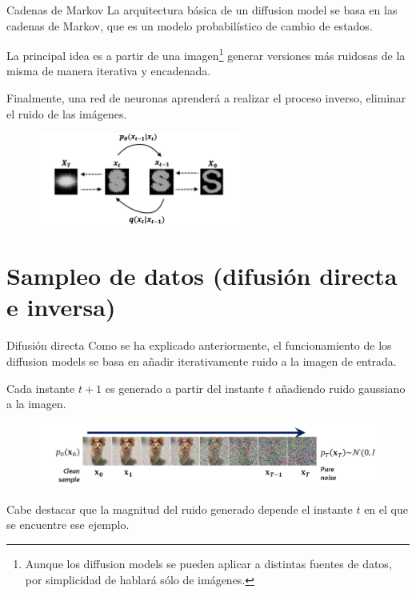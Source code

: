 \begin{frame}{Cadenas de Markov}
La arquitectura básica de un diffusion model se basa en las \alert{cadenas de Markov}, que es un modelo probabilístico de cambio de estados.

La principal idea es a partir de una imagen\footnote{Aunque los diffusion models se pueden aplicar a distintas fuentes de datos, por simplicidad de hablará sólo de imágenes.} generar \alert{versiones más ruidosas} de la misma de manera iterativa y encadenada.

Finalmente, una \alert{red de neuronas} aprenderá a realizar el proceso inverso, eliminar el ruido de las imágenes.

\begin{figure}
    \centering
    \includegraphics[width=0.6\textwidth]{figures/Diffusion_Models/DifussionModel_Basic.png}
    \caption{\cite{DifussionModel_Basic}}
\end{figure}
\end{frame}

\section{Sampleo de datos (difusión directa e inversa)}

\begin{frame}{Difusión directa}
Como se ha explicado anteriormente, el funcionamiento de los diffusion models se basa en añadir iterativamente \alert{ruido} a la imagen de entrada.

Cada instante $t+1$ es generado a partir del instante $t$ añadiendo \alert{ruido gaussiano} a la imagen.

\begin{figure}
    \centering
    \includegraphics[width=\textwidth]{figures/Diffusion_Models/Noising_Process.png}
    \caption{\cite{vahdat2022improving}}
\end{figure}

Cabe destacar que la \alert{magnitud} del ruido generado depende el instante \alert{$t$} en el que se encuentre ese ejemplo.
\end{frame}


